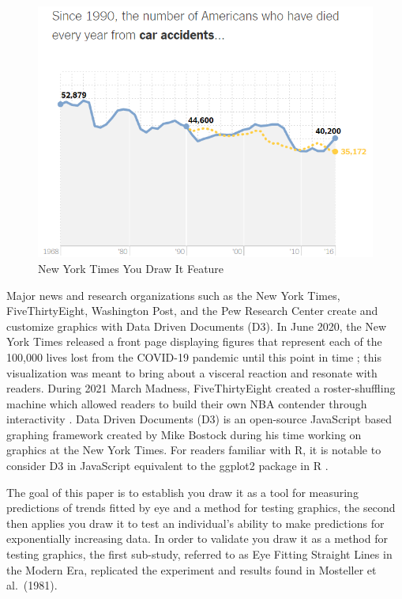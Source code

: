 \documentclass[12pt]{article}
\begin{document}
\begin{figure}[tbp]

{\centering \includegraphics[width=0.75\linewidth,]{images/nyt-caraccidents-frame4} 

}

\caption{New York Times You Draw It Feature}\label{fig:nyt-caraccidents}
\end{figure}

Major news and research organizations such as the New York Times,
FiveThirtyEight, Washington Post, and the Pew Research Center create and
customize graphics with Data Driven Documents (D3). In June 2020, the
New York Times released a front page displaying figures that represent
each of the 100,000 lives lost from the COVID-19 pandemic until this
point in time \citep{NYTrememberinglives}; this visualization was meant
to bring about a visceral reaction and resonate with readers. During
2021 March Madness, FiveThirtyEight created a roster-shuffling machine
which allowed readers to build their own NBA contender through
interactivity \citep{ryanabest_2021}. Data Driven Documents (D3) is an
open-source JavaScript based graphing framework created by Mike Bostock
during his time working on graphics at the New York Times. For readers
familiar with R, it is notable to consider D3 in JavaScript equivalent
to the ggplot2 package in R \citep{ggplot2}.

The goal of this paper is to establish you draw it as a tool for
measuring predictions of trends fitted by eye and a method for testing
graphics, the second then applies you draw it to test an individual's
ability to make predictions for exponentially increasing data. In order
to validate you draw it as a method for testing graphics, the first
sub-study, referred to as Eye Fitting Straight Lines in the Modern Era,
replicated the experiment and results found in Mosteller et al.~(1981).
\end{document}
